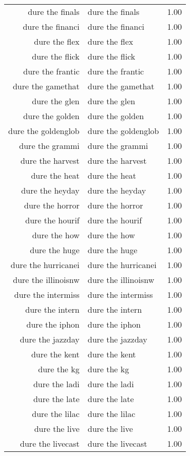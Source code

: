 \begin{table}[ht]
\begin{tabular}{rlr}
  dure the finals & dure the finals & 1.00 \\ 
  dure the financi & dure the financi & 1.00 \\ 
  dure the flex & dure the flex & 1.00 \\ 
  dure the flick & dure the flick & 1.00 \\ 
  dure the frantic & dure the frantic & 1.00 \\ 
  dure the gamethat & dure the gamethat & 1.00 \\ 
  dure the glen & dure the glen & 1.00 \\ 
  dure the golden & dure the golden & 1.00 \\ 
  dure the goldenglob & dure the goldenglob & 1.00 \\ 
  dure the grammi & dure the grammi & 1.00 \\ 
  dure the harvest & dure the harvest & 1.00 \\ 
  dure the heat & dure the heat & 1.00 \\ 
  dure the heyday & dure the heyday & 1.00 \\ 
  dure the horror & dure the horror & 1.00 \\ 
  dure the hourif & dure the hourif & 1.00 \\ 
  dure the how & dure the how & 1.00 \\ 
  dure the huge & dure the huge & 1.00 \\ 
  dure the hurricanei & dure the hurricanei & 1.00 \\ 
  dure the illinoisnw & dure the illinoisnw & 1.00 \\ 
  dure the intermiss & dure the intermiss & 1.00 \\ 
  dure the intern & dure the intern & 1.00 \\ 
  dure the iphon & dure the iphon & 1.00 \\ 
  dure the jazzday & dure the jazzday & 1.00 \\ 
  dure the kent & dure the kent & 1.00 \\ 
  dure the kg & dure the kg & 1.00 \\ 
  dure the ladi & dure the ladi & 1.00 \\ 
  dure the late & dure the late & 1.00 \\ 
  dure the lilac & dure the lilac & 1.00 \\ 
  dure the live & dure the live & 1.00 \\ 
  dure the livecast & dure the livecast & 1.00 \\ 

\end{tabular}
\end{table}
